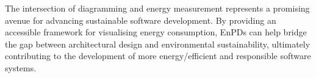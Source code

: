 \documentclass[11pt,a4paper]{article}
\begin{document}
The intersection of diagramming and energy measurement represents a promising avenue for advancing sustainable software development.
By providing an accessible framework for visualising energy consumption, EnPDs can help bridge the gap between architectural design and environmental sustainability, ultimately contributing to the development of more energy\-/efficient and responsible software systems.

\printbibliography
\end{document}
